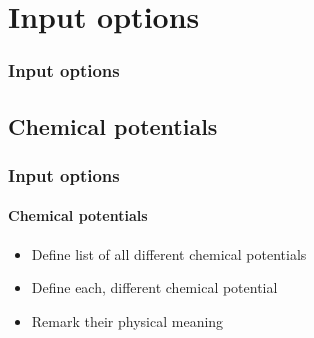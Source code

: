 \section{Input options}

\begin{framenologo}
  \frametitle{Input options}
  \tableofcontents[currentsection]
\end{framenologo}

\subsection{Chemical potentials}


\begin{frame}%
  \frametitle{Input options}
  \framesubtitle{Chemical potentials}

  \begin{itemize}
    \item Define list of all different chemical potentials

    \item<2-> Define each, different chemical potential

    \item<3-> Remark their physical meaning

  \end{itemize}

\end{frame}
